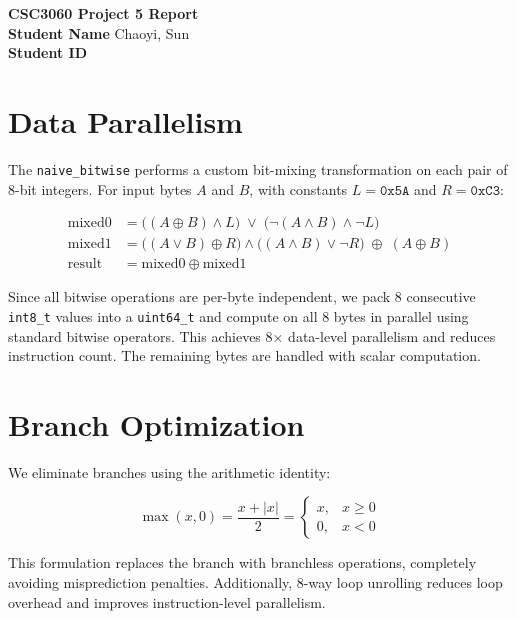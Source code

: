 \documentclass[11pt]{article}
\begin{document}
\begin{center}
    \centering
    {\Huge \textbf{CSC3060 Project 5 Report}} \\[0.5cm]
    
    \textbf{Student Name} \quad Chaoyi, Sun \\[0.1cm]
    \textbf{Student ID}  \\[1cm]
\end{center}

\section{Data Parallelism}

The \texttt{naive\_bitwise} performs a custom bit-mixing transformation on each pair of 8-bit integers. For input bytes \(A\) and \(B\), with constants \(L = \texttt{0x5A}\) and \(R = \texttt{0xC3}\):

\[
\begin{aligned}
\text{mixed0} &= \big((A \oplus B) \land L\big) \;\lor\; \big(\lnot(A \land B) \land \lnot L \big) \\
\text{mixed1} &= \big((A \lor B) \oplus R\big) \land \big((A \land B) \lor \lnot R\big) \;\oplus\; (A \oplus B) \\
\text{result} &= \text{mixed0} \oplus \text{mixed1}
\end{aligned}
\]

\noindent Since all bitwise operations are per-byte independent, we pack 8 consecutive \texttt{int8\_t} values into a \texttt{uint64\_t} and compute on all 8 bytes in parallel using standard bitwise operators. This achieves 8× data-level parallelism and reduces instruction count. The remaining bytes are handled with scalar computation.

\section{Branch Optimization}

We eliminate branches using the arithmetic identity:

\[
\max(x,0) = \frac{x + |x|}{2} = \begin{cases}
x, & x \ge 0 \\
0, & x < 0
\end{cases}
\]

\noindent This formulation replaces the branch with branchless operations, completely avoiding misprediction penalties. Additionally, 8-way loop unrolling reduces loop overhead and improves instruction-level parallelism.
\end{document}
